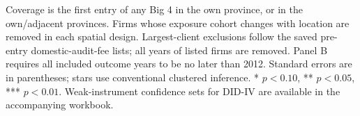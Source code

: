 \documentclass[10pt]{article}
\begin{document}
\begin{minipage}{23.60cm}
Coverage is the first entry of any Big 4 in the own province, or in the own/adjacent provinces. Firms whose exposure cohort changes with location are removed in each spatial design. Largest-client exclusions follow the saved pre-entry domestic-audit-fee lists; all years of listed firms are removed.
Panel B requires all included outcome years to be no later than 2012. Standard errors are in parentheses; stars use conventional clustered inference. * $p<0.10$, ** $p<0.05$, *** $p<0.01$. Weak-instrument confidence sets for DID-IV are available in the accompanying workbook.
\end{minipage}
\end{document}
